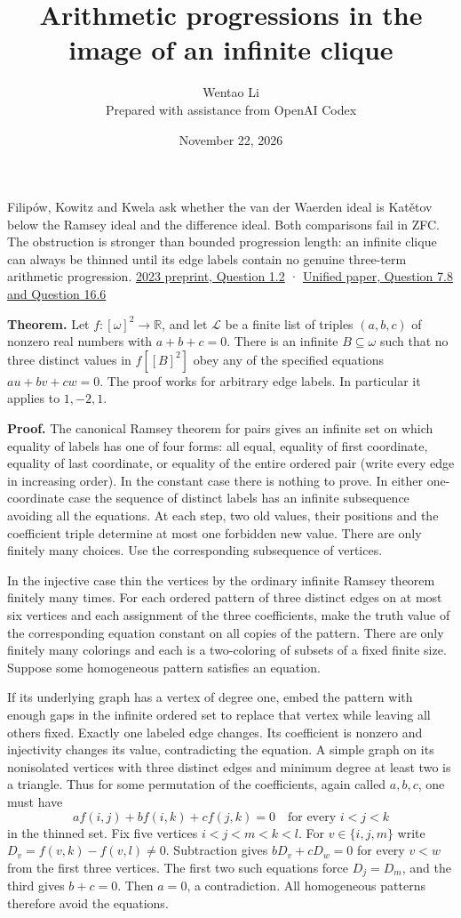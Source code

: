 \documentclass[11pt]{article}
\author{Wentao Li\\\small Prepared with assistance from OpenAI Codex}
\date{November 22, 2026}
\title{Arithmetic progressions in the image of an infinite clique}
\begin{document}
\maketitle
Filipów, Kowitz and Kwela ask whether the van der Waerden ideal is Katětov below the Ramsey ideal and the difference ideal. Both comparisons fail in ZFC. The obstruction is stronger than bounded progression length: an infinite clique can always be thinned until its edge labels contain no genuine three-term arithmetic progression. \href{https://arxiv.org/abs/2307.06881}{2023 preprint, Question 1.2} · \href{https://doi.org/10.1017/jsl.2024.8}{Unified paper, Question 7.8 and Question 16.6}

\textbf{Theorem.} Let \(f:[\omega]^2\to\mathbb R\), and let \(\mathcal L\) be a finite list of triples \((a,b,c)\) of nonzero real numbers with \(a+b+c=0\). There is an infinite \(B\subseteq\omega\) such that no three distinct values in \(f[[B]^2]\) obey any of the specified equations \(au+bv+cw=0\). The proof works for arbitrary edge labels. In particular it applies to \(1,-2,1\).

\textbf{Proof.} The canonical Ramsey theorem for pairs gives an infinite set on which equality of labels has one of four forms: all equal, equality of first coordinate, equality of last coordinate, or equality of the entire ordered pair (write every edge in increasing order). In the constant case there is nothing to prove. In either one-coordinate case the sequence of distinct labels has an infinite subsequence avoiding all the equations. At each step, two old values, their positions and the coefficient triple determine at most one forbidden new value. There are only finitely many choices. Use the corresponding subsequence of vertices.

In the injective case thin the vertices by the ordinary infinite Ramsey theorem finitely many times. For each ordered pattern of three distinct edges on at most six vertices and each assignment of the three coefficients, make the truth value of the corresponding equation constant on all copies of the pattern. There are only finitely many colorings and each is a two-coloring of subsets of a fixed finite size. Suppose some homogeneous pattern satisfies an equation.

If its underlying graph has a vertex of degree one, embed the pattern with enough gaps in the infinite ordered set to replace that vertex while leaving all others fixed. Exactly one labeled edge changes. Its coefficient is nonzero and injectivity changes its value, contradicting the equation. A simple graph on its nonisolated vertices with three distinct edges and minimum degree at least two is a triangle. Thus for some permutation of the coefficients, again called \(a,b,c\), one must have \[
 a f(i,j)+b f(i,k)+c f(j,k)=0 \quad\text{for every }i<j<k
\] in the thinned set. Fix five vertices \(i<j<m<k<l\). For \(v\in\{i,j,m\}\) write \(D_v=f(v,k)-f(v,l)\ne0\). Subtraction gives \(bD_v+cD_w=0\) for every \(v<w\) from the first three vertices. The first two such equations force \(D_j=D_m\), and the third gives \(b+c=0\). Then \(a=0\), a contradiction. All homogeneous patterns therefore avoid the equations.
\end{document}
